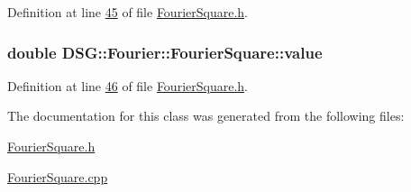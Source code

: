 Definition at line \hyperlink{_fourier_square_8h_source_l00045}{45} of file \hyperlink{_fourier_square_8h_source}{Fourier\+Square.\+h}.

\hypertarget{class_d_s_g_1_1_fourier_1_1_fourier_square_a5817c7b9b793af6a76278065a67acd9c}{
\subsubsection[{value}]{\setlength{\rightskip}{0pt plus 5cm}double D\+S\+G\+::\+Fourier\+::\+Fourier\+Square\+::value\hspace{0.3cm}{\ttfamily [protected]}}}\label{class_d_s_g_1_1_fourier_1_1_fourier_square_a5817c7b9b793af6a76278065a67acd9c}


Definition at line \hyperlink{_fourier_square_8h_source_l00046}{46} of file \hyperlink{_fourier_square_8h_source}{Fourier\+Square.\+h}.



The documentation for this class was generated from the following files\+:\begin{DoxyCompactItemize}
\item 
\hyperlink{_fourier_square_8h}{Fourier\+Square.\+h}\item 
\hyperlink{_fourier_square_8cpp}{Fourier\+Square.\+cpp}\end{DoxyCompactItemize}
